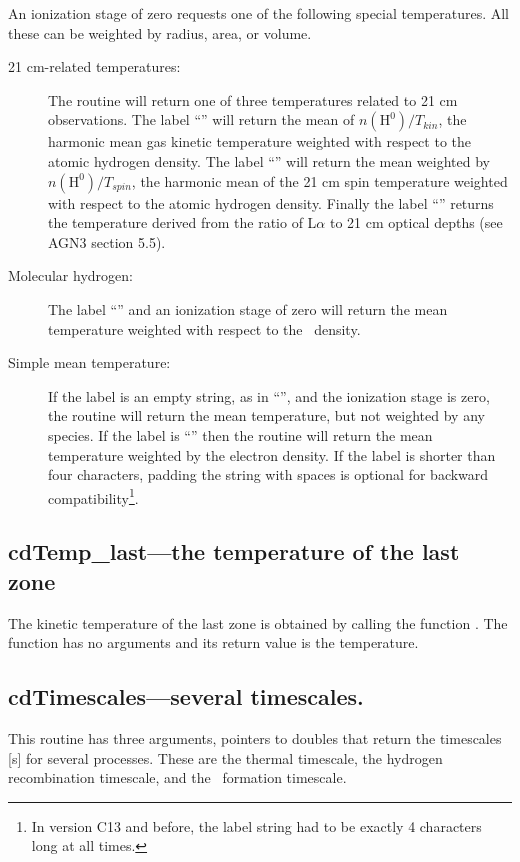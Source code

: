 An ionization stage of zero requests one of the following special
temperatures. All these can be weighted by radius, area, or volume.
\begin{description}
\item[21 cm-related temperatures:]  The routine will return one of three
temperatures related to 21 cm observations.
The label ``\cdTerm{21cm}'' will return
the mean of $n(\mathrm{H}^0)/T_{kin}$, the harmonic mean gas kinetic temperature weighted
with respect to the atomic hydrogen density.
The label ``'' will return the mean weighted by
$n(\mathrm{H}^0)/T_{spin}$, the harmonic mean of the 21 cm spin temperature weighted with
respect to the atomic hydrogen density.
Finally the label ``'' returns the
temperature derived from the ratio of L$\alpha $ to 21
cm optical depths (see AGN3 section 5.5).

\item[Molecular hydrogen:]  The label ``''
and an ionization stage of zero will return the mean temperature
weighted with respect to the \htwo\ density.

\item[Simple mean temperature:]  If the label is an empty string, as in
``'', and the ionization stage is zero, the routine will return the
mean temperature, but not weighted by any
species. If the label is ``'' then the routine will return
the mean temperature weighted by the electron density.
If the label is shorter than four characters, padding the
string with spaces is optional for backward compatibility\footnote{In
  version C13 and before, the label string had to be exactly 4 characters
  long at all times.}.
\end{description}

\subsection{cdTemp\_last---the temperature of the last zone}

The kinetic temperature of the last zone is obtained by calling the
function .
The function has no arguments and its return value
is the temperature.

\subsection{cdTimescales---several timescales.}

This routine has three arguments, pointers to doubles that return the
timescales [s] for several processes.
These are the thermal timescale,
the hydrogen recombination timescale, and the \htwo\ formation timescale.


